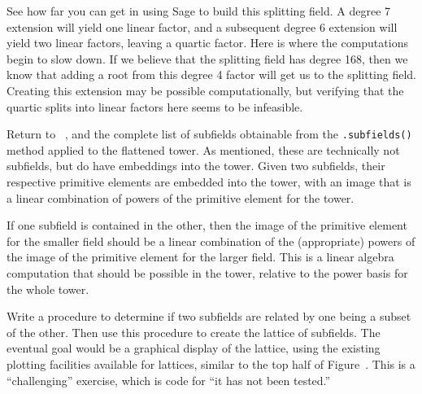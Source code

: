 %
See how far you can get in using Sage to build this splitting field.  A degree 7 extension will yield one linear factor, and a subsequent degree 6 extension will yield two linear factors, leaving a quartic factor.  Here is where the computations begin to slow down.  If we believe that the splitting field has degree 168, then we know that adding a root from this degree 4 factor will get us to the splitting field.  Creating this extension may be possible computationally, but verifying that the quartic splits into linear factors here seems to be infeasible.
\begin{sageverbatim}\end{sageverbatim}
%
%
Return to ~, and the complete list of subfields obtainable from the \verb?.subfields()? method applied to the flattened tower.  As mentioned, these are technically not subfields, but do have embeddings into the tower.  Given two subfields, their respective primitive elements are embedded into the tower, with an image that is a linear combination of powers of the primitive element for the tower.\par
%
If one subfield is contained in the other, then the image of the primitive element for the smaller field should be a linear combination of the (appropriate) powers of the image of the primitive element for the larger field.  This is a linear algebra computation that should be possible in the tower, relative to the power basis for the whole tower.\par
%
Write a procedure to determine if two subfields are related by one being a subset of the other.  Then use this procedure to create the lattice of subfields.  The eventual goal would be a graphical display of the lattice, using the existing plotting facilities available for lattices, similar to the top half of Figure~.  This is a ``challenging'' exercise, which is code for ``it has not been tested.''
\begin{sageverbatim}\end{sageverbatim}
%

